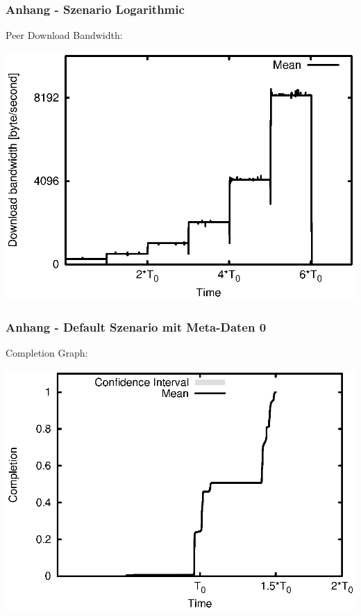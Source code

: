 \begin{frame}
  \frametitle{Anhang - Szenario Logarithmic}
  Peer Download Bandwidth:
  
  \begin{center}
    \includegraphics[width=1\textwidth]{fig/plots/scenario_3_log/plots/GeneratedMeanCurrentDownloadBandwidth.csv.eps}
  \end{center}
\end{frame}




\begin{frame}
  \frametitle{Anhang - Default Szenario mit Meta-Daten 0}
  Completion Graph:
  
  \begin{center}
    \includegraphics[width=1\textwidth]{fig/plots/scenario_5_meta_data_0/plots/GeneratedMeanChunkCompletion.csv.eps}
  \end{center}
\end{frame}


